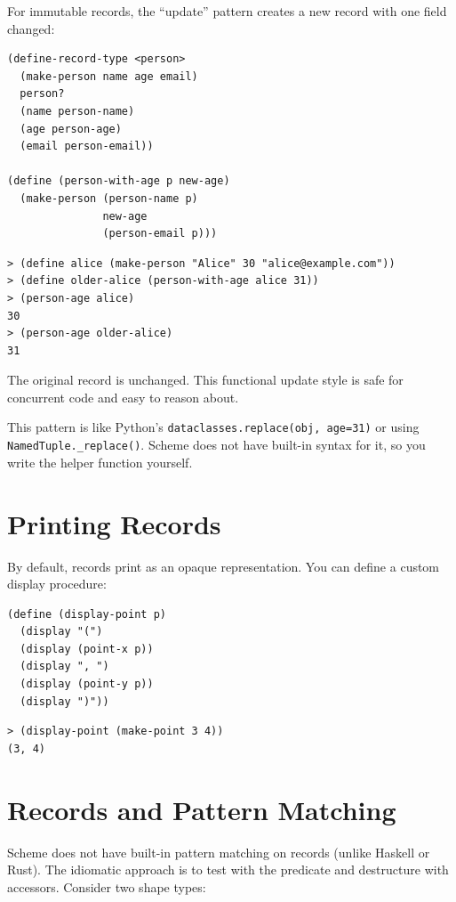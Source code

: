 For immutable records, the ``update'' pattern creates a new record with one field changed:

\begin{lstlisting}
(define-record-type <person>
  (make-person name age email)
  person?
  (name person-name)
  (age person-age)
  (email person-email))

(define (person-with-age p new-age)
  (make-person (person-name p)
               new-age
               (person-email p)))
\end{lstlisting}

\begin{lstlisting}[style=repl]
> (define alice (make-person "Alice" 30 "alice@example.com"))
> (define older-alice (person-with-age alice 31))
> (person-age alice)
30
> (person-age older-alice)
31
\end{lstlisting}

The original record is unchanged. This functional update style is safe for concurrent code and easy to reason about.

\begin{note}
This pattern is like Python's \texttt{dataclasses.replace(obj, age=31)} or using \texttt{NamedTuple.\_replace()}. Scheme does not have built-in syntax for it, so you write the helper function yourself.
\end{note}

\section{Printing Records}

By default, records print as an opaque representation. You can define a custom display procedure:

\begin{lstlisting}
(define (display-point p)
  (display "(")
  (display (point-x p))
  (display ", ")
  (display (point-y p))
  (display ")"))
\end{lstlisting}

\begin{lstlisting}[style=repl]
> (display-point (make-point 3 4))
(3, 4)
\end{lstlisting}

\section{Records and Pattern Matching}

Scheme does not have built-in pattern matching on records (unlike Haskell or Rust). The idiomatic approach is to test with the predicate and destructure with accessors. Consider two shape types:

